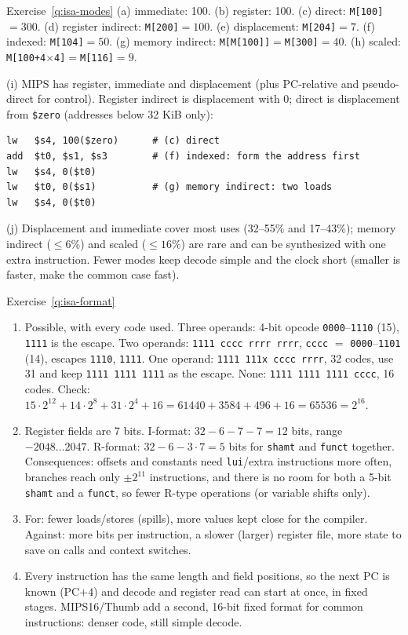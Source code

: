 \begin{noot}{Exercise~\ref{q:isa-modes}}
(a) immediate: 100. (b) register: 100. (c) direct: \texttt{M[100]}$=300$.
(d) register indirect: \texttt{M[200]}$=100$. (e) displacement:
\texttt{M[204]}$=7$. (f) indexed: \texttt{M[104]}$=50$. (g) memory indirect:
\texttt{M[M[100]]}$=$\texttt{M[300]}$=40$. (h) scaled:
\texttt{M[100+4$\times$4]}$=$\texttt{M[116]}$=9$.

(i) MIPS has register, immediate and displacement (plus PC-relative and
pseudo-direct for control). Register indirect is displacement with 0; direct is
displacement from \texttt{\$zero} (addresses below 32 KiB only):
\begin{lstlisting}
lw   $s4, 100($zero)      # (c) direct
add  $t0, $s1, $s3        # (f) indexed: form the address first
lw   $s4, 0($t0)
lw   $t0, 0($s1)          # (g) memory indirect: two loads
lw   $s4, 0($t0)
\end{lstlisting}
(j) Displacement and immediate cover most uses (32--55\% and 17--43\%); memory
indirect ($\le6\%$) and scaled ($\le16\%$) are rare and can be synthesized
with one extra instruction. Fewer modes keep decode simple and the clock short
(smaller is faster, make the common case fast).
\end{noot}

\begin{noot}{Exercise~\ref{q:isa-format}}
\begin{enumerate}[label=(\alph*),leftmargin=*]
  \item Possible, with every code used. Three operands: 4-bit opcode
  \texttt{0000}--\texttt{1110} (15), \texttt{1111} is the escape. Two operands:
  \texttt{1111 cccc rrrr rrrr}, \texttt{cccc} $=$ \texttt{0000}--\texttt{1101}
  (14), escapes \texttt{1110}, \texttt{1111}. One operand:
  \texttt{1111 111x cccc rrrr}, 32 codes, use 31 and keep
  \texttt{1111 1111 1111} as the escape. None: \texttt{1111 1111 1111 cccc},
  16 codes. Check: $15\cdot2^{12}+14\cdot2^8+31\cdot2^4+16=61440+3584+496+16=65536=2^{16}$.
  \item Register fields are 7 bits. I-format: $32-6-7-7=12$ bits, range
  $-2048\ldots2047$. R-format: $32-6-3\cdot7=5$ bits for \texttt{shamt} and
  \texttt{funct} together. Consequences: offsets and constants need
  \texttt{lui}/extra instructions more often, branches reach only $\pm2^{11}$
  instructions, and there is no room for both a 5-bit \texttt{shamt} and a
  \texttt{funct}, so fewer R-type operations (or variable shifts only).
  \item For: fewer loads/stores (spills), more values kept close for the
  compiler. Against: more bits per instruction, a slower (larger) register file,
  more state to save on calls and context switches.
  \item Every instruction has the same length and field positions, so the next
  PC is known (PC$+4$) and decode and register read can start at once, in fixed
  stages. MIPS16/Thumb add a second, 16-bit fixed format for common
  instructions: denser code, still simple decode.
\end{enumerate}
\end{noot}

